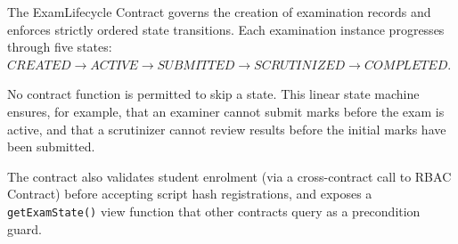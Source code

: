 \documentclass[conference]{IEEEtran}
\begin{document}
The ExamLifecycle Contract governs the creation of examination records and
enforces strictly ordered state transitions. Each examination instance
progresses through five states: $CREATED \rightarrow ACTIVE \rightarrow SUBMITTED \rightarrow SCRUTINIZED \rightarrow COMPLETED.$


No contract function is permitted to skip a state. This linear state machine
ensures, for example, that an examiner cannot submit marks before the exam is
active, and that a scrutinizer cannot review results before the initial marks
have been submitted.

The contract also validates student enrolment (via a cross-contract call to
RBAC Contract) before accepting script hash registrations, and
exposes a \texttt{getExamState()} view function that other contracts query as
a precondition guard.




\end{document}
